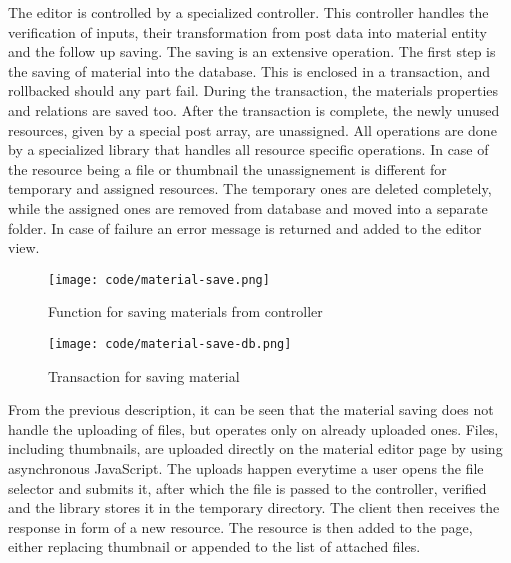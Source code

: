 \documentclass[
  digital,     %
  oneside,     %
  nosansbold,  %
  colorbold, %
  lof,         %
  lot,         %
]{fithesis4}
\begin{document}
The editor is controlled by a specialized controller. This controller handles the verification of inputs,
their transformation from post data into material entity and the follow up saving. The saving is an
extensive operation. The first step is the saving of material into the database. This is enclosed in a
transaction, and rollbacked should any part fail. During the transaction, the materials properties and
relations are saved too. After the transaction is complete, the newly unused resources, given by a
special post array, are unassigned. All operations are done by a specialized library that handles all
resource specific operations. In case of the resource being a file or thumbnail the unassignement is
different for temporary and assigned resources. The temporary ones are deleted completely, while
the assigned ones are removed from database and moved into a separate folder. In case of failure an
error message is returned and added to the editor view.

\begin{figure}[!htbp]
	\begin{center}
		\begin{minipage}{.9\textwidth}
			\texttt{[image: code/material-save.png]}
		\end{minipage}
	\end{center}
	\caption{Function for saving materials from controller}
	\label{fig:material-save}
\end{figure}

\begin{figure}[!htbp]
	\begin{center}
		\begin{minipage}{.8\textwidth}
			\texttt{[image: code/material-save-db.png]}
		\end{minipage}
	\end{center}
	\caption{Transaction for saving material}
	\label{fig:material-save-db}
\end{figure}

From the previous description, it can be seen that the material saving does not handle the uploading
of files, but operates only on already uploaded ones. Files, including thumbnails, are uploaded directly
on the material editor page by using asynchronous JavaScript. The uploads happen everytime a user
opens the file selector and submits it, after which the file is passed to the controller, verified and the
library stores it in the temporary directory. The client then receives the response in form of a new
resource. The resource is then added to the page, either replacing thumbnail or appended to the list
of attached files.
\end{document}
